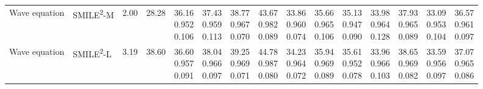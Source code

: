 \documentclass[letterpaper]{article} %
\newcommand{\smiletwo}{SMILE\textsuperscript{2}}
\begin{document}
\begin{table}[!t]
{\begin{tabular}{ll|cc|*{10}{c}|c}
\rowcolor{oursgreen}
Wave equation & \smiletwo-M & 2.00 & 28.28 & \makecell{36.16\\0.952\\0.106} & \makecell{37.43\\0.959\\0.113} & \makecell{38.77\\0.967\\0.070} & \makecell{43.67\\0.982\\0.089} & \makecell{33.86\\0.960\\0.074} & \makecell{35.66\\0.965\\0.106} & \makecell{35.13\\0.947\\0.090} & \makecell{33.98\\0.964\\0.128} & \makecell{37.93\\0.965\\0.089} & \makecell{33.09\\0.953\\0.104} & \makecell{36.57\\0.961\\0.097} \\
\rowcolor{oursgreen}
Wave equation & \smiletwo-L & 3.19 & 38.60 & \makecell{36.60\\0.957\\0.091} & \makecell{38.04\\0.966\\0.097} & \makecell{39.25\\0.969\\0.071} & \makecell{44.78\\0.987\\0.080} & \makecell{34.23\\0.964\\0.072} & \makecell{35.94\\0.969\\0.089} & \makecell{35.61\\0.952\\0.078} & \makecell{33.96\\0.966\\0.103} & \makecell{38.65\\0.969\\0.082} & \makecell{33.59\\0.956\\0.097} & \makecell{37.07\\0.965\\0.086} \\
\bottomrule
\end{tabular}}
\end{table}
\end{document}
